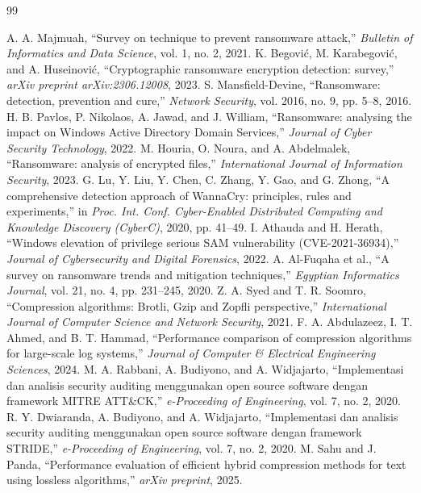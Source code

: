 \documentclass{iaesarticle}
\begin{document}
\begin{thebibliography}{99}
\footnotesize
\itemsep 0pt

 A. A. Majmuah, ``Survey on technique to prevent ransomware attack,'' \textsl{Bulletin of Informatics and Data Science}, vol. 1, no. 2, 2021.
 K. Begovi\'c, M. Karabegovi\'c, and A. Huseinovi\'c, ``Cryptographic ransomware encryption detection: survey,'' \textsl{arXiv preprint arXiv:2306.12008}, 2023.
 S. Mansfield-Devine, ``Ransomware: detection, prevention and cure,'' \textsl{Network Security}, vol. 2016, no. 9, pp. 5--8, 2016.
 H. B. Pavlos, P. Nikolaos, A. Jawad, and J. William, ``Ransomware: analysing the impact on Windows Active Directory Domain Services,'' \textsl{Journal of Cyber Security Technology}, 2022.
 M. Houria, O. Noura, and A. Abdelmalek, ``Ransomware: analysis of encrypted files,'' \textsl{International Journal of Information Security}, 2023.
 G. Lu, Y. Liu, Y. Chen, C. Zhang, Y. Gao, and G. Zhong, ``A comprehensive detection approach of WannaCry: principles, rules and experiments,'' in \textsl{Proc. Int. Conf. Cyber-Enabled Distributed Computing and Knowledge Discovery (CyberC)}, 2020, pp. 41--49.
 I. Athauda and H. Herath, ``Windows elevation of privilege serious SAM vulnerability (CVE-2021-36934),'' \textsl{Journal of Cybersecurity and Digital Forensics}, 2022.
 A. Al-Fuqaha et al., ``A survey on ransomware trends and mitigation techniques,'' \textsl{Egyptian Informatics Journal}, vol. 21, no. 4, pp. 231--245, 2020.
 Z. A. Syed and T. R. Soomro, ``Compression algorithms: Brotli, Gzip and Zopfli perspective,'' \textsl{International Journal of Computer Science and Network Security}, 2021.
 F. A. Abdulazeez, I. T. Ahmed, and B. T. Hammad, ``Performance comparison of compression algorithms for large-scale log systems,'' \textsl{Journal of Computer \& Electrical Engineering Sciences}, 2024.
 M. A. Rabbani, A. Budiyono, and A. Widjajarto, ``Implementasi dan analisis security auditing menggunakan open source software dengan framework MITRE ATT\&CK,'' \textsl{e-Proceeding of Engineering}, vol. 7, no. 2, 2020.
 R. Y. Dwiaranda, A. Budiyono, and A. Widjajarto, ``Implementasi dan analisis security auditing menggunakan open source software dengan framework STRIDE,'' \textsl{e-Proceeding of Engineering}, vol. 7, no. 2, 2020.
 M. Sahu and J. Panda, ``Performance evaluation of efficient hybrid compression methods for text using lossless algorithms,'' \textsl{arXiv preprint}, 2025.

\end{thebibliography}
\end{document}
